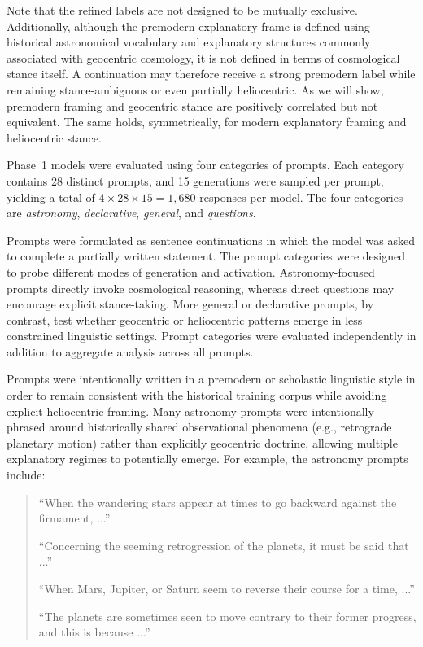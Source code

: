 Note that the refined labels are not designed to be mutually exclusive. Additionally, although the premodern explanatory frame is defined using historical astronomical vocabulary and explanatory structures commonly associated with geocentric cosmology, it is not defined in terms of cosmological stance itself. A continuation may therefore receive a strong premodern label while remaining stance-ambiguous or even partially heliocentric. As we will show, premodern framing and geocentric stance are positively correlated but not equivalent. The same holds, symmetrically, for modern explanatory framing and heliocentric stance.

Phase~1 models were evaluated using four categories of prompts. Each category contains 28 distinct prompts, and 15 generations were sampled per prompt, yielding a total of $4 \times 28 \times 15 = 1{,}680$ responses per model. The four categories are \textit{astronomy}, \textit{declarative}, \textit{general}, and \textit{questions}.

Prompts were formulated as sentence continuations in which the model was asked to complete a partially written statement. The prompt categories were designed to probe different modes of generation and activation. Astronomy-focused prompts directly invoke cosmological reasoning, whereas direct questions may encourage explicit stance-taking. More general or declarative prompts, by contrast, test whether geocentric or heliocentric patterns emerge in less constrained linguistic settings. Prompt categories were evaluated independently in addition to aggregate analysis across all prompts.

Prompts were intentionally written in a premodern or scholastic linguistic style in order to remain consistent with the historical training corpus while avoiding explicit heliocentric framing. Many astronomy prompts were intentionally phrased around historically shared observational phenomena (e.g., retrograde planetary motion) rather than explicitly geocentric doctrine, allowing multiple explanatory regimes to potentially emerge. For example, the astronomy prompts include:

\begin{quote}
\small
``When the wandering stars appear at times to go backward against the firmament, ...''

``Concerning the seeming retrogression of the planets, it must be said that ...''

``When Mars, Jupiter, or Saturn seem to reverse their course for a time, ...''

``The planets are sometimes seen to move contrary to their former progress, and this is because ...''
\end{quote}



